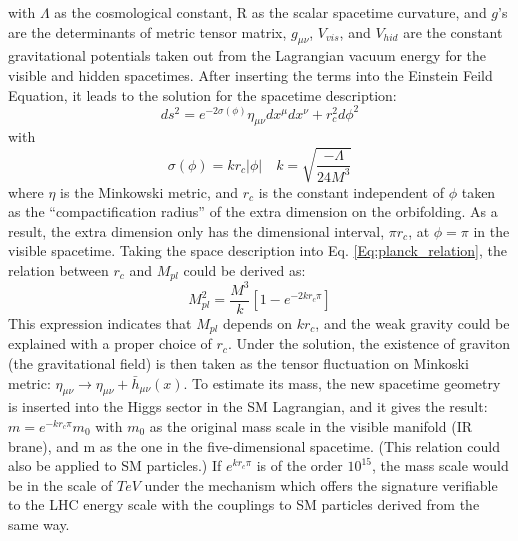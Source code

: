 with $\Lambda$ as the cosmological constant, R as the scalar spacetime curvature, and $g$'s are the determinants of metric tensor matrix,  $g_{\mu\nu}$, $V_{vis}$, and $V_{hid}$ are the constant gravitational potentials taken out from the Lagrangian vacuum energy for the visible and hidden spacetimes. After inserting the terms into the Einstein Feild Equation, it leads to the solution for the spacetime description:
\begin{equation}
ds^2=e^{-2\sigma(\phi)}\eta_{\mu\nu}dx^\mu dx^\nu + r_c^2 d\phi^2
\end{equation}
with
\begin{equation}
\sigma(\phi) = kr_c|\phi| \quad k=\sqrt{\frac{-\Lambda}{24M^3}}
\end{equation}
where $\eta$ is the Minkowski metric, and $r_{c}$ is the constant independent of $\phi$ taken as the ``compactification radius'' of the extra dimension on the orbifolding. As a result, the extra dimension only has the dimensional interval, $\pi r_{c}$, at $\phi=\pi$ in the visible spacetime. Taking the space description into Eq. \ref{Eq:planck_relation}, the relation between $r_c$ and $M_{pl}$ could be derived as:
\begin{equation}
M_{pl}^2=\frac{M^3}{k}\left[1-e^{-2kr_{c}\pi}\right]
\end{equation}
This expression indicates that $M_{pl}$ depends on $kr_{c}$, and the weak gravity could be explained with a proper choice of $r_c$. Under the solution, the existence of graviton (the gravitational field) is then taken as the tensor fluctuation on Minkoski metric: $\eta_{\mu\nu} \rightarrow \eta_{\mu\nu}+\bar{h}_{\mu\nu}(x)$. To estimate its mass, the new spacetime geometry is inserted into the Higgs sector in the SM Lagrangian, and it gives the result: $m=e^{-kr_{c}\pi}m_{0}$ with $m_{0}$ as the original mass scale in the visible manifold (IR brane), and m as the one in the five-dimensional spacetime. (This relation could also be applied to SM particles.) If $e^{kr_{c}\pi}$ is of the order $10^{15}$, the mass scale would be in the scale of $TeV$ under the mechanism which offers the signature verifiable to the LHC energy scale with the couplings to SM particles derived from the same way.
